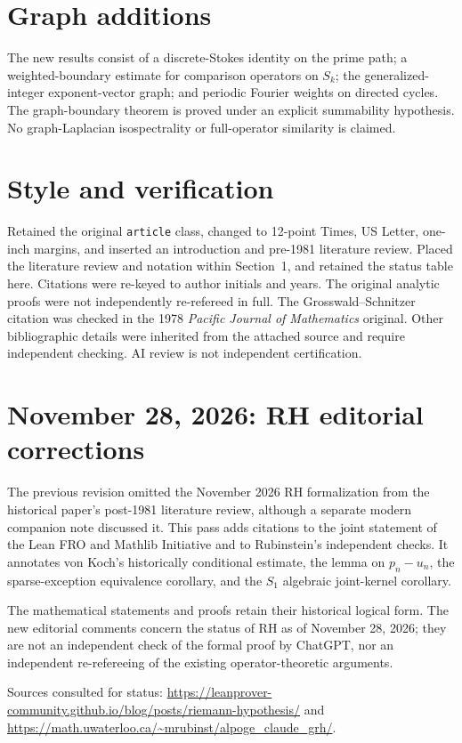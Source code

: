 \documentclass[12pt,letterpaper]{article}
\begin{document}
\section{Graph additions}
The new results consist of a discrete-Stokes identity on the
prime path; a weighted-boundary estimate for comparison
operators on $S_k$; the generalized-integer exponent-vector
graph; and periodic Fourier weights on directed cycles.
The graph-boundary theorem is proved under an explicit
summability hypothesis. No graph-Laplacian isospectrality
or full-operator similarity is claimed.

\section{Style and verification}
Retained the original \texttt{article} class, changed
to 12-point Times, US Letter, one-inch margins, and
inserted an introduction and pre-1981 literature review.
Placed the literature review and notation within Section~1, and retained the status table here.
Citations were re-keyed to author initials and years.
The original analytic proofs were not independently
re-refereed in full. The Grosswald--Schnitzer citation
was checked in the 1978 \emph{Pacific Journal of Mathematics}
original. Other bibliographic details were inherited
from the attached source and require independent checking.
AI review is not independent certification.

\section{November 28, 2026: RH editorial corrections}
The previous revision omitted the November 2026 RH formalization from
the historical paper's post-1981 literature review, although a separate
modern companion note discussed it. This pass adds citations to the
joint statement of the Lean FRO and Mathlib Initiative and to
Rubinstein's independent checks. It annotates von Koch's historically
conditional estimate, the lemma on $p_n-u_n$, the sparse-exception
equivalence corollary, and the $S_1$ algebraic joint-kernel corollary.

The mathematical statements and proofs retain their historical
logical form. The new editorial comments concern the status of RH
as of November 28, 2026; they are not an independent check of the
formal proof by ChatGPT, nor an independent re-refereeing of the
existing operator-theoretic arguments.

Sources consulted for status:
\url{https://leanprover-community.github.io/blog/posts/riemann-hypothesis/}
and
\url{https://math.uwaterloo.ca/~mrubinst/alpoge_claude_grh/}.
\end{document}
